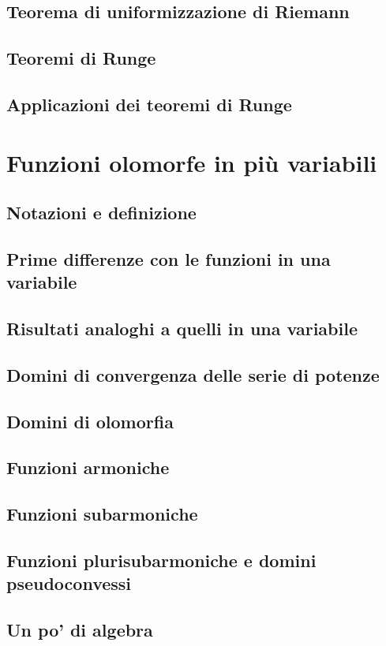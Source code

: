 \documentclass{article}
\begin{document}
\subsection{Teorema di uniformizzazione di Riemann}


\subsection{Teoremi di Runge}


\subsection{Applicazioni dei teoremi di Runge}


\newpage

\section{Funzioni olomorfe in più variabili}

\subsection{Notazioni e definizione}


\subsection{Prime differenze con le funzioni in una variabile}


\subsection{Risultati analoghi a quelli in una variabile}


\subsection{Domini di convergenza delle serie di potenze}


\subsection{Domini di olomorfia}


\subsection{Funzioni armoniche}


\subsection{Funzioni subarmoniche}


\subsection{Funzioni plurisubarmoniche e domini pseudoconvessi}


\subsection{Un po' di algebra}

\end{document}
